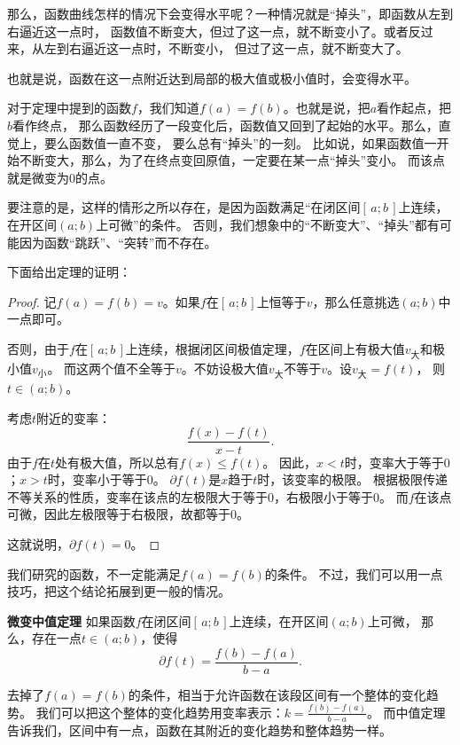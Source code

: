 \documentclass[12pt,UTF8]{ctexbook}
\begin{document}
那么，函数曲线怎样的情况下会变得水平呢？一种情况就是“掉头”，即函数从左到右逼近这一点时，
函数值不断变大，但过了这一点，就不断变小了。或者反过来，从左到右逼近这一点时，不断变小，
但过了这一点，就不断变大了。

也就是说，函数在这一点附近达到局部的极大值或极小值时，会变得水平。

对于定理中提到的函数$f$，我们知道$f(a) = f(b)$。也就是说，把$a$看作起点，把$b$看作终点，
那么函数经历了一段变化后，函数值又回到了起始的水平。那么，直觉上，要么函数值一直不变，
要么总有“掉头”的一刻。
比如说，如果函数值一开始不断变大，那么，为了在终点变回原值，一定要在某一点“掉头”变小。
而该点就是微变为$0$的点。

要注意的是，这样的情形之所以存在，是因为函数满足“在闭区间$[\,a; b\,]$上连续，在开区间$(a; b)$上可微”的条件。
否则，我们想象中的“不断变大”、“掉头”都有可能因为函数“跳跃”、“突转”而不存在。

下面给出定理的证明：
\begin{proof}
    记$f(a) = f(b) = v$。如果$f$在$[\,a; b\,]$上恒等于$v$，那么任意挑选$(a; b)$中一点即可。

    否则，由于$f$在$[\,a; b\,]$上连续，根据闭区间极值定理，$f$在区间上有极大值$v_{\text{大}}$和极小值$v_{\text{小}}$。
    而这两个值不全等于$v$。不妨设极大值$v_{\text{大}}$不等于$v$。设$v_{\text{大}} = f(t)$，
    则$t\in(a; b)$。

    考虑$t$附近的变率：
    $$ \frac{f(x) - f(t)}{x - t}. $$
    由于$f$在$t$处有极大值，所以总有$f(x) \leqslant f(t)$。
    因此，$x<t$时，变率大于等于$0$；$x>t$时，变率小于等于$0$。
    $\partial f(t)$是$x$趋于$t$时，该变率的极限。
    根据极限传递不等关系的性质，变率在该点的左极限大于等于$0$，右极限小于等于$0$。
    而$f$在该点可微，因此左极限等于右极限，故都等于$0$。
    
    这就说明，$ \partial f(t) = 0$。
\end{proof}

我们研究的函数，不一定能满足$f(a) = f(b)$的条件。
不过，我们可以用一点技巧，把这个结论拓展到更一般的情况。

\begin{tm}{\textbf{微变中值定理}}\label{tm:2-4-10}
    如果函数$f$在闭区间$[\,a; b\,]$上连续，在开区间$(a; b)$上可微，
    那么，存在一点$t\in(a; b)$，使得
    $$ \partial f(t) = \frac{f(b) - f(a)}{b - a}.$$
\end{tm}

去掉了$f(a) = f(b)$的条件，相当于允许函数在该段区间有一个整体的变化趋势。
我们可以把这个整体的变化趋势用变率表示：$k = \frac{f(b) - f(a)}{b - a}$。
而中值定理告诉我们，区间中有一点，函数在其附近的变化趋势和整体趋势一样。
\end{document}
